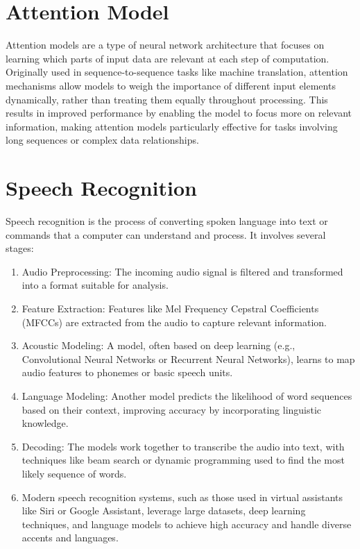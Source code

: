 \documentclass{article}
\begin{document}
\section{\Huge Attention Model}
Attention models are a type of neural network architecture that focuses on learning which parts of input data are relevant at each step of computation. Originally used in sequence-to-sequence tasks like machine translation, attention mechanisms allow models to weigh the importance of different input elements dynamically, rather than treating them equally throughout processing. This results in improved performance by enabling the model to focus more on relevant information, making attention models particularly effective for tasks involving long sequences or complex data relationships.

\section{\Huge Speech Recognition}
Speech recognition is the process of converting spoken language into text or commands that a computer can understand and process. It involves several stages:
\begin{enumerate}
    \item Audio Preprocessing: The incoming audio signal is filtered and transformed into a format suitable for analysis.
    \item Feature Extraction: Features like Mel Frequency Cepstral Coefficients (MFCCs) are extracted from the audio to capture relevant information.
    \item Acoustic Modeling: A model, often based on deep learning (e.g., Convolutional Neural Networks or Recurrent Neural Networks), learns to map audio features to phonemes or basic speech units.
    \item Language Modeling: Another model predicts the likelihood of word sequences based on their context, improving accuracy by incorporating linguistic knowledge.
    \item Decoding: The models work together to transcribe the audio into text, with techniques like beam search or dynamic programming used to find the most likely sequence of words.
    \item Modern speech recognition systems, such as those used in virtual assistants like Siri or Google Assistant, leverage large datasets, deep learning techniques, and language models to achieve high accuracy and handle diverse accents and languages.
\end{enumerate}
\end{document}

